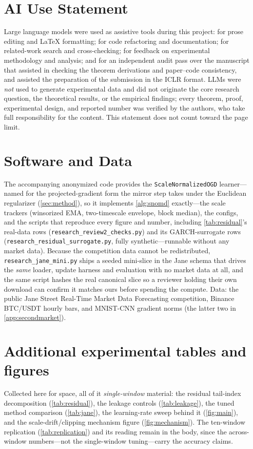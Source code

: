 \documentclass{article}
\begin{document}
\section*{AI Use Statement}
Large language models were used as assistive tools during this project: for prose editing and
LaTeX formatting; for code refactoring and documentation; for related-work search and
cross-checking; for feedback on experimental methodology and analysis; and for an independent
audit pass over the manuscript that assisted in checking the theorem derivations and
paper--code consistency,
and assisted the preparation of the submission in the ICLR format. LLMs were \emph{not} used to generate experimental data and did not originate the
core research question, the theoretical results, or the empirical findings; every theorem,
proof, experimental design, and reported number was verified by the authors, who take full
responsibility for the content. This statement does not count toward the page limit.




\newpage
\appendix

\section*{Software and Data}
The accompanying anonymized code provides the \texttt{ScaleNormalizedOGD} learner---named for
the projected-gradient form the mirror step takes under the Euclidean regularizer
(\cref{sec:method}), so it implements \cref{alg:snomd} exactly---the scale trackers
(winsorized EMA, two-timescale envelope, block median), the configs, and the scripts that
reproduce every figure and number, including \cref{tab:residual}'s real-data rows
(\texttt{research\_review2\_checks.py}) and its GARCH-surrogate rows
(\texttt{research\_residual\_surrogate.py}, fully synthetic---runnable without any market data).
Because the competition data cannot be redistributed, \texttt{research\_jane\_mini.py} ships a
seeded mini-slice in the Jane schema that drives the \emph{same} loader, update harness and
evaluation with no market data at all, and the same script hashes the real canonical slice so a
reviewer holding their own download can confirm it matches ours before spending the compute.
Data: the public Jane Street Real-Time Market Data Forecasting competition, Binance BTC/USDT
hourly bars, and MNIST-CNN gradient norms (the latter two in \cref{app:secondmarket}).

\section{Additional experimental tables and figures}
\label{app:tables}
Collected here for space, all of it \emph{single-window} material: the residual tail-index
decomposition (\cref{tab:residual}), the leakage controls (\cref{tab:leakage}), the tuned
method comparison (\cref{tab:jane}), the learning-rate sweep behind it (\cref{fig:main}), and
the scale-drift/clipping mechanism figure (\cref{fig:mechanism}). The ten-window replication
(\cref{tab:replication}) and its reading remain in the body, since the across-window
numbers---not the single-window tuning---carry the accuracy claims.
\end{document}
